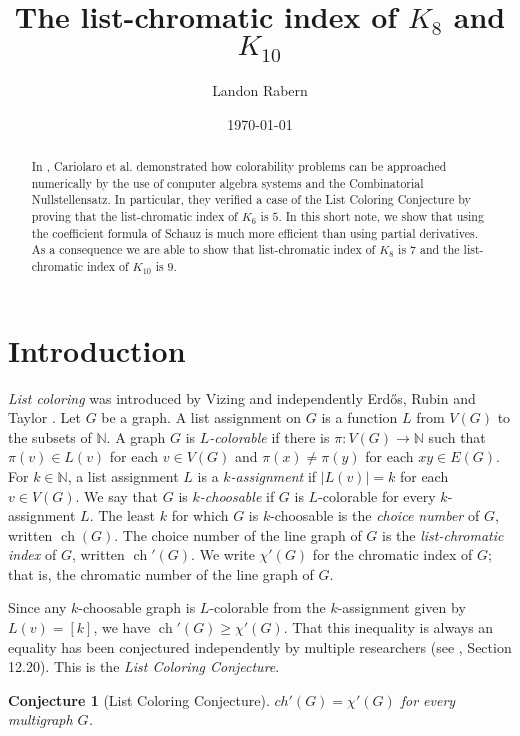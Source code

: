 \documentclass[12pt]{article}
\title{The list-chromatic index of $K_8$ and $K_{10}$}
\author{Landon Rabern}
\date{\today}
\theoremstyle{plain}
\newtheorem{conjecture}[thm]{Conjecture}
\theoremstyle{definition}
\theoremstyle{remark}
\newcommand{\IN}{\mathbb{N}}
\newcommand{\card}[1]{\left|#1\right|}
\newcommand{\func}[3]{#1\colon #2 \rightarrow #3}
\newcommand{\irange}[1]{\left[#1\right]}
\newcommand{\ch}{\operatorname{ch}}
\begin{document}
\maketitle

\begin{abstract}
In \cite{cariolaro2014list}, Cariolaro et al. demonstrated how colorability problems can be approached numerically by the use of computer
algebra systems and the Combinatorial Nullstellensatz.  In particular, they verified a case of the List Coloring Conjecture by proving that the list-chromatic index of $K_6$ is $5$.  In this short note, we show that using the coefficient formula of Schauz \cite{schauz2008algebraically} is much more efficient than using partial derivatives.  As a consequence we are able to show that list-chromatic index of $K_8$ is $7$ and the list-chromatic index of $K_{10}$ is $9$.
\end{abstract}

\section{Introduction}
\emph{List coloring} was introduced by Vizing \cite{vizing1976} and independently Erd\H{o}s, Rubin and Taylor \cite{erdos1979choosability}.  Let $G$ be a graph. A list assignment on $G$ is a function $L$ from $V(G)$ to the subsets of $\IN$.   A graph $G$ is \emph{$L$-colorable} if there is $\func{\pi}{V(G)}{\IN}$ such that $\pi(v) \in L(v)$ for each $v \in V(G)$ and $\pi(x) \ne \pi(y)$ for each $xy \in E(G)$.   For $k \in \IN$, a list assignment $L$ is a \emph{$k$-assignment} if $\card{L(v)} = k$ for each $v \in V(G)$. We say that $G$ is \emph{$k$-choosable} if $G$ is $L$-colorable for every $k$-assignment $L$. The least $k$ for which $G$ is $k$-choosable is the \emph{choice number} of $G$, written $\ch(G)$.  The choice number of the line graph of $G$ is the \emph{list-chromatic index} of $G$, written $\ch'(G)$.  We write $\chi'(G)$ for the chromatic index of $G$; that is, the chromatic number of the line graph of $G$.

Since any $k$-choosable graph is $L$-colorable from the $k$-assignment given by $L(v) = \irange{k}$, we have $\ch'(G) \ge \chi'(G)$.  That this inequality is always an equality has been conjectured independently by multiple researchers (see \cite{GraphColoringProblems}, Section 12.20).  This is the \emph{List Coloring Conjecture}.  

\begin{conjecture}[List Coloring Conjecture]
$ch'(G) = \chi'(G)$ for every multigraph $G$.
\end{conjecture}
\end{document}
